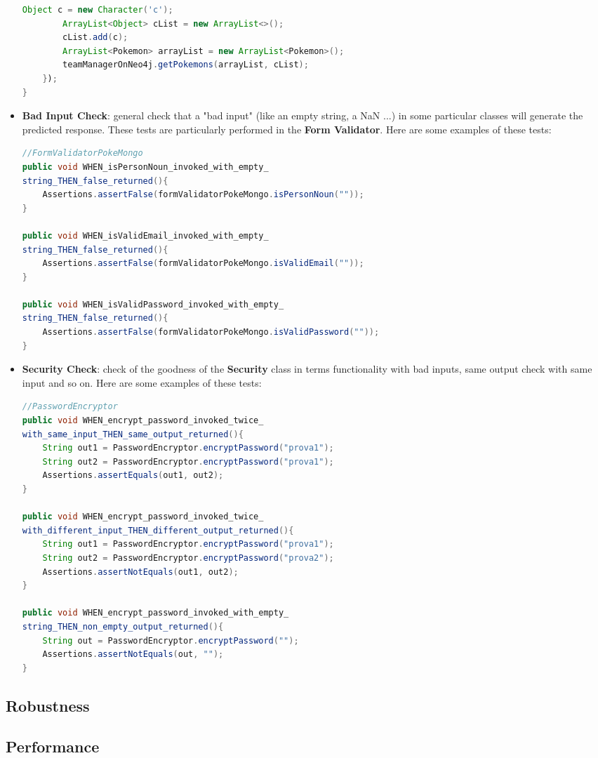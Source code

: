 \begin{itemize}
\begin{lstlisting}[language=Java]
		Object c = new Character('c');
		ArrayList<Object> cList = new ArrayList<>();
		cList.add(c);
		ArrayList<Pokemon> arrayList = new ArrayList<Pokemon>();
		teamManagerOnNeo4j.getPokemons(arrayList, cList);
	});
}
\end{lstlisting}
	
	\item \textbf{Bad Input Check}: general check that a "bad input" (like an empty string, a NaN ...) in some particular classes will generate the predicted response. These tests are particularly performed in the \textbf{Form Validator}. Here are some examples of these tests:
\begin{lstlisting}[language=Java]
//FormValidatorPokeMongo
public void WHEN_isPersonNoun_invoked_with_empty_
string_THEN_false_returned(){
	Assertions.assertFalse(formValidatorPokeMongo.isPersonNoun(""));
}

public void WHEN_isValidEmail_invoked_with_empty_
string_THEN_false_returned(){
	Assertions.assertFalse(formValidatorPokeMongo.isValidEmail(""));
}

public void WHEN_isValidPassword_invoked_with_empty_
string_THEN_false_returned(){
	Assertions.assertFalse(formValidatorPokeMongo.isValidPassword(""));
}

\end{lstlisting} 
	\item \textbf{Security Check}: check of the goodness of the \textbf {Security} class in terms functionality with bad inputs, same output check with same input and so on. Here are some examples of these tests:
\begin{lstlisting}[language=Java]
//PasswordEncryptor
public void WHEN_encrypt_password_invoked_twice_
with_same_input_THEN_same_output_returned(){
	String out1 = PasswordEncryptor.encryptPassword("prova1");
	String out2 = PasswordEncryptor.encryptPassword("prova1");
	Assertions.assertEquals(out1, out2);
}

public void WHEN_encrypt_password_invoked_twice_
with_different_input_THEN_different_output_returned(){
	String out1 = PasswordEncryptor.encryptPassword("prova1");
	String out2 = PasswordEncryptor.encryptPassword("prova2");
	Assertions.assertNotEquals(out1, out2);
}

public void WHEN_encrypt_password_invoked_with_empty_
string_THEN_non_empty_output_returned(){
	String out = PasswordEncryptor.encryptPassword("");
	Assertions.assertNotEquals(out, "");
}
\end{lstlisting}
\end{itemize}
\subsection{Robustness}
\subsection{Performance}
